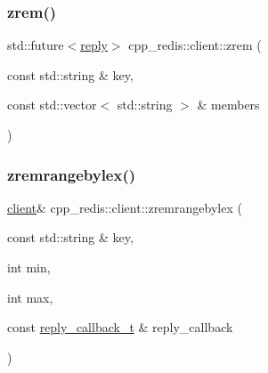 \mbox{\label{classcpp__redis_1_1client_aff2e5ec7005f76869fad79c4e8bd68c8}} 
\subsubsection{\texorpdfstring{zrem()}{zrem()}\hspace{0.1cm}{\footnotesize\ttfamily [2/2]}}
{\footnotesize\ttfamily std\+::future$<$\hyperlink{classcpp__redis_1_1reply}{reply}$>$ cpp\+\_\+redis\+::client\+::zrem (\begin{DoxyParamCaption}\item[{const std\+::string \&}]{key,  }\item[{const std\+::vector$<$ std\+::string $>$ \&}]{members }\end{DoxyParamCaption})}

\mbox{\label{classcpp__redis_1_1client_aff3c4f11d504ba64a98b6bce9bf319a0}} 
\subsubsection{\texorpdfstring{zremrangebylex()}{zremrangebylex()}\hspace{0.1cm}{\footnotesize\ttfamily [1/6]}}
{\footnotesize\ttfamily \hyperlink{classcpp__redis_1_1client}{client}\& cpp\+\_\+redis\+::client\+::zremrangebylex (\begin{DoxyParamCaption}\item[{const std\+::string \&}]{key,  }\item[{int}]{min,  }\item[{int}]{max,  }\item[{const \hyperlink{classcpp__redis_1_1client_a061a1140d36d2eaeda82b09a0bb3f9f2}{reply\+\_\+callback\+\_\+t} \&}]{reply\+\_\+callback }\end{DoxyParamCaption})}

\mbox{\label{classcpp__redis_1_1client_a9277ebc759190ce6f085a60a98ad3a7c}} 
